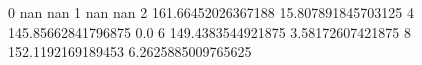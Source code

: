 0 nan nan
1 nan nan
2 161.66452026367188 15.807891845703125
4 145.85662841796875 0.0
6 149.4383544921875 3.58172607421875
8 152.1192169189453 6.2625885009765625
